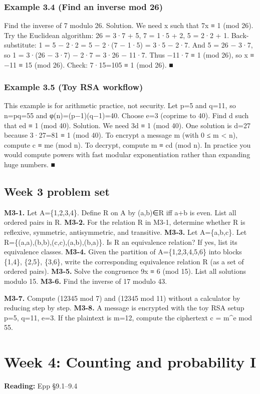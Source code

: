 \documentclass[11pt]{article}
\begin{document}
\subsubsection*{Example 3.4 (Find an inverse mod 26)}
Find the inverse of 7 modulo 26.
Solution. We need x such that 7x ≡ 1 (mod 26). Try the Euclidean algorithm:
26 = 3·7 + 5, 7 = 1·5 + 2, 5 = 2·2 + 1.
Back-substitute: 1 = 5 − 2·2 = 5 − 2·(7 − 1·5) = 3·5 − 2·7.
And 5 = 26 − 3·7, so 1 = 3·(26 − 3·7) − 2·7 = 3·26 − 11·7.
Thus −11·7 ≡ 1 (mod 26), so x ≡ −11 ≡ 15 (mod 26).
Check: 7·15=105 ≡ 1 (mod 26). ■
\subsubsection*{Example 3.5 (Toy RSA workflow)}
This example is for arithmetic practice, not security. Let p=5 and q=11, so
n=pq=55 and φ(n)=(p−1)(q−1)=40.
Choose e=3 (coprime to 40). Find d such that ed ≡ 1 (mod 40).
Solution. We need 3d ≡ 1 (mod 40). One solution is d=27 because 3·27=81 ≡ 1
(mod 40).
To encrypt a message m (with 0 ≤ m < n), compute c ≡ me (mod n). To decrypt,
compute m ≡ cd (mod n).
In practice you would compute powers with fast modular exponentiation rather
than expanding huge numbers. ■
\subsection*{Week 3 problem set}
\textbf{M3-1.} Let A=\{1,2,3,4\}. Define R on A by (a,b)∈R iff a+b is even. List all ordered pairs in
R.
\textbf{M3-2.} For the relation R in M3-1, determine whether R is reflexive, symmetric,
antisymmetric, and transitive.
\textbf{M3-3.} Let A=\{a,b,c\}. Let R=\{(a,a),(b,b),(c,c),(a,b),(b,a)\}. Is R an equivalence relation? If
yes, list its equivalence classes.
\textbf{M3-4.} Given the partition of A=\{1,2,3,4,5,6\} into blocks \{1,4\}, \{2,5\}, \{3,6\}, write the
corresponding equivalence relation R (as a set of ordered pairs).
\textbf{M3-5.} Solve the congruence 9x ≡ 6 (mod 15). List all solutions modulo 15.
\textbf{M3-6.} Find the inverse of 17 modulo 43.

\textbf{M3-7.} Compute (12345 mod 7) and (12345 mod 11) without a calculator by reducing
step by step.
\textbf{M3-8.} A message is encrypted with the toy RSA setup p=5, q=11, e=3. If the plaintext is
m=12, compute the ciphertext c = m\textasciicircum{}e mod 55.

\clearpage
\section{Week 4: Counting and probability I}
\textbf{Reading:} Epp §9.1–9.4
\end{document}
